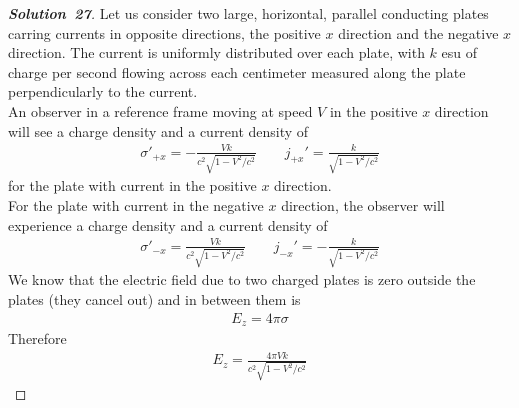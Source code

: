 \documentclass[11pt]{article}
\theoremstyle{definition}
\renewcommand*{\proofname}{\bf{Solution}}
\begin{document}
\cleardoublepage
\begin{proof}[\proofname\ 27]
Let us consider two large, horizontal, parallel conducting plates carring
currents in opposite directions, the positive $x$ direction and the negative
$x$ direction. The current is uniformly distributed over each plate, with $k$
esu of charge per second flowing across each centimeter measured along the
plate perpendicularly to the current.\\
An observer in a reference frame moving at speed $V$ in the positive $x$
direction will see a charge density and a current density of
\begin{align*}
    \sigma'_{+x} = -\frac{Vk}{c^2\sqrt{1 - V^2/c^2}}
    \qquad
    j_{+x}' = \frac{k}{\sqrt{1 - V^2/c^2}}
\end{align*}
for the plate with current in the positive $x$ direction.\\
For the plate with current in the negative $x$ direction, the observer will
experience a charge density and a current density of
\begin{align*}
    \sigma'_{-x} = \frac{Vk}{c^2\sqrt{1 - V^2/c^2}}
    \qquad
    j_{-x}' = -\frac{k}{\sqrt{1 - V^2/c^2}}
\end{align*}
We know that the electric field due to two charged plates is zero outside the
plates (they cancel out) and in between them is 
\begin{align*}
    E_z = 4\pi \sigma
\end{align*}
Therefore
\begin{align*}
    E_z = \frac{4\pi Vk}{c^2\sqrt{1 - V^2/c^2}}
\end{align*}
\end{proof}
\end{document}
